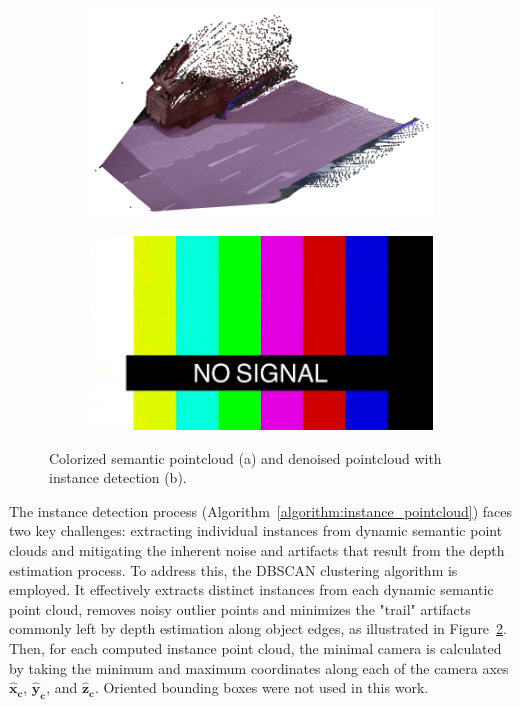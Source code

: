 \begin{figure}[h!]
    \centering
    \begin{subfigure}[b]{0.45\textwidth}
        \includegraphics[width=\linewidth]{images/methodology/pcd_semantic.png}
        \caption{}
        \label{fig:semantic_pointcloud_a}
    \end{subfigure}
    \hfill
    \begin{subfigure}[b]{0.45\textwidth}
        \includegraphics[width=\textwidth]{images/shared/no_signal.jpg}
        \caption{}
        \label{fig:semantic_pointcloud_b}
    \end{subfigure}

    \caption{Colorized semantic pointcloud (a) and denoised pointcloud with instance detection (b).}
    \label{fig:semantic_pointcloud}
\end{figure}

The instance detection process (Algorithm~\ref{algorithm:instance_pointcloud}) faces two key challenges: extracting individual instances from dynamic semantic point clouds and mitigating the inherent noise and artifacts that result from the depth estimation process. To address this, the DBSCAN clustering algorithm is employed. It effectively extracts distinct instances from each dynamic semantic point cloud, removes noisy outlier points and minimizes the "trail" artifacts commonly left by depth estimation along object edges, as illustrated in Figure~\ref{fig:semantic_pointcloud_b}. Then, for each computed instance point cloud, the minimal camera  is calculated by taking the minimum and maximum coordinates along each of the camera axes $\mathbf{\hat{x}_c}$, $\mathbf{\hat{y}_c}$, and $\mathbf{\hat{z}_c}$. Oriented bounding boxes were not used in this work.

